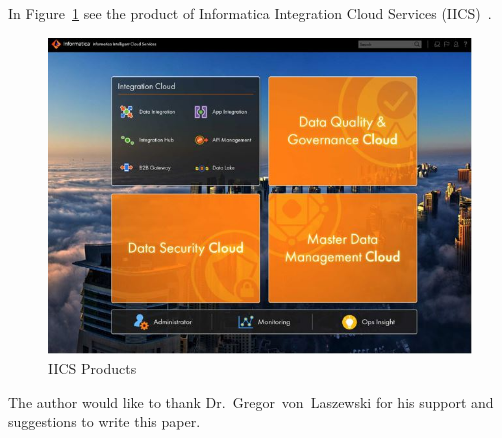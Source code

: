 In Figure~\ref{f:iics-products}\cite{hid-sp18-511-iics} see the
product of Informatica Integration Cloud Services
(IICS)~\cite{hid-sp18-511-iics}.


\begin{figure}[!ht]
	\centering\includegraphics[width=\columnwidth]{images/IICS-0.jpg}
	\caption{IICS Products}\label{f:iics-products}
\end{figure}

\begin{acks}

The author would like to thank Dr.~Gregor~von~Laszewski for his
support and suggestions to write this paper.

\end{acks}


 
